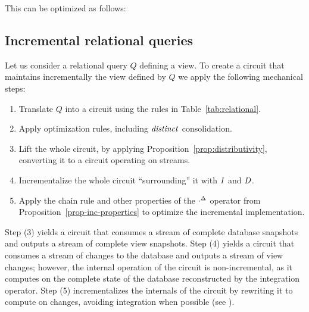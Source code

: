 This can be optimized as follows:


\subsection{Incremental relational queries}\label{sec:incremental-relational}

Let us consider a relational query $Q$ 
defining a view.  To create a circuit that maintains incrementally the view defined by $Q$
we apply the following mechanical steps:

\begin{algorithm}\label{algorithm-inc}\quad
\begin{enumerate}
    \item Translate $Q$ into a circuit using the rules in Table~\ref{tab:relational}.
    \item Apply optimization rules, including $\mathit{distinct}$ consolidation.
    \item Lift the whole circuit, by applying Proposition~\ref{prop:distributivity},
    converting it to a circuit operating on streams.
    \item Incrementalize the whole circuit ``surrounding'' it with $\mathit{I}$ and $\mathit{D}$.
    \item Apply the chain rule and other properties of the ${\cdot}^{\Delta}$ operator
    from Proposition~\ref{prop-inc-properties} to optimize the incremental implementation.
\end{enumerate}
\end{algorithm}

Step (3) yields a circuit that consumes a stream of complete database snapshots and outputs a 
stream of complete view snapshots. Step (4) yields a circuit that consumes a stream of changes
to the database and outputs a stream of view changes; however, the internal operation of the 
circuit is non-incremental, as it computes on the complete state of the database reconstructed
by the integration operator.  Step (5) incrementalizes the internals of the circuit by rewriting 
it to compute on changes, avoiding integration when possible (see ).

